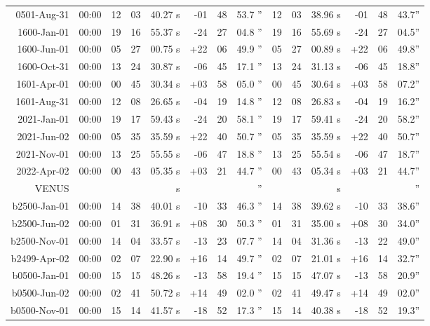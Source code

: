 \begin{longtable}{r@{\,}r|r@{h\,}r@{m\,}r<{s}|r@{°\,}r@{'\,}r<{''}||r@{h\,}r@{m\,}r<{s}|r@{°\,}r@{'\,}r<{''}}
 0501-Aug-31 & 00:00  &   12 & 03 & 40.27 & -01 & 48 & 53.7 & 12&03&38.96 & -01&48&43.7\\ %
 1600-Jan-01 & 00:00  &   19 & 16 & 55.37 & -24 & 27 & 04.8 & 19&16&55.69 & -24&27&04.5\\ %
 1600-Jun-01 & 00:00  &   05 & 27 & 00.75 & +22 & 06 & 49.9 & 05&27&00.89 & +22&06&49.8\\ %
 1600-Oct-31 & 00:00  &   13 & 24 & 30.87 & -06 & 45 & 17.1 & 13&24&31.13 & -06&45&18.8\\ %
 1601-Apr-01 & 00:00  &   00 & 45 & 30.34 & +03 & 58 & 05.0 & 00&45&30.64 & +03&58&07.2\\ %
 1601-Aug-31 & 00:00  &   12 & 08 & 26.65 & -04 & 19 & 14.8 & 12&08&26.83 & -04&19&16.2\\ %
 2021-Jan-01 & 00:00  &   19 & 17 & 59.43 & -24 & 20 & 58.1 & 19&17&59.41 & -24&20&58.2\\ %
 2021-Jun-02 & 00:00  &   05 & 35 & 35.59 & +22 & 40 & 50.7 & 05&35&35.59 & +22&40&50.7\\ %
 2021-Nov-01 & 00:00  &   13 & 25 & 55.55 & -06 & 47 & 18.8 & 13&25&55.54 & -06&47&18.7\\ %
 2022-Apr-02 & 00:00  &   00 & 43 & 05.35 & +03 & 21 & 44.7 & 00&43&05.34 & +03&21&44.7\\ %
VENUS    \\
b2500-Jan-01 & 00:00  &   14 & 38 & 40.01 & -10 & 33 & 46.3 & 14&38&39.62 & -10&33&38.6\\ %
b2500-Jun-02 & 00:00  &   01 & 31 & 36.91 & +08 & 30 & 50.3 & 01&31&35.00 & +08&30&34.0\\ %
b2500-Nov-01 & 00:00  &   14 & 04 & 33.57 & -13 & 23 & 07.7 & 14&04&31.36 & -13&22&49.0\\ %
b2499-Apr-02 & 00:00  &   02 & 07 & 22.90 & +16 & 14 & 49.7 & 02&07&21.01 & +16&14&32.7\\ %
b0500-Jan-01 & 00:00  &   15 & 15 & 48.26 & -13 & 58 & 19.4 & 15&15&47.07 & -13&58&20.9\\ %
b0500-Jun-02 & 00:00  &   02 & 41 & 50.72 & +14 & 49 & 02.0 & 02&41&49.47 & +14&49&02.0\\ %
b0500-Nov-01 & 00:00  &   15 & 14 & 41.57 & -18 & 52 & 17.3 & 15&14&40.38 & -18&52&19.3\\ %

\end{longtable}
